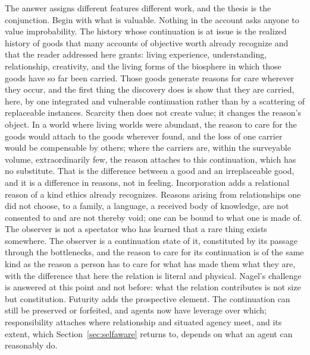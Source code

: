 The answer assigns different features different work, and the thesis is the
conjunction. Begin with what is valuable. Nothing in the account asks anyone
to value improbability. The history whose continuation is at issue is the
realized history of goods that many accounts of objective worth already
recognize and that the reader addressed here grants: living experience,
understanding, relationship, creativity, and
the living forms of the biosphere in which those goods have so far been
carried. Those goods generate reasons for care wherever they occur, and the
first thing the discovery does is show that they are carried, here, by one
integrated and vulnerable continuation rather than by a scattering of
replaceable instances. Scarcity then does not create value; it changes the
reason's object. In a world where living worlds were abundant, the reason to
care for the goods would attach to the goods wherever found, and the loss of
one carrier would be compensable by others; where the carriers are, within the
surveyable volume, extraordinarily few, the reason attaches to this
continuation, which has no substitute. That is the difference between a good
and an irreplaceable good, and it is a difference in reasons, not in feeling.
Incorporation adds a relational reason of a kind ethics already recognizes.
Reasons arising from relationships one did not choose, to a family, a
language, a received body of knowledge, are not consented to and are not
thereby void; one can be bound to what one is made of. The observer is not a
spectator who has learned that a rare thing exists somewhere. The observer is
a continuation state of it, constituted by its passage through the
bottlenecks, and the reason to care for its continuation is of the same kind
as the reason a person has to care for what has made them what they are, with
the difference that here the relation is literal and physical. Nagel's
challenge is answered at this point and not before: what the relation
contributes is not size but constitution. Futurity adds the prospective
element. The continuation can still be preserved or forfeited, and agents now
have leverage over which; responsibility attaches where relationship and
situated agency meet, and its extent, which Section~\ref{sec:selfaware}
returns to, depends on what an agent can reasonably do.


